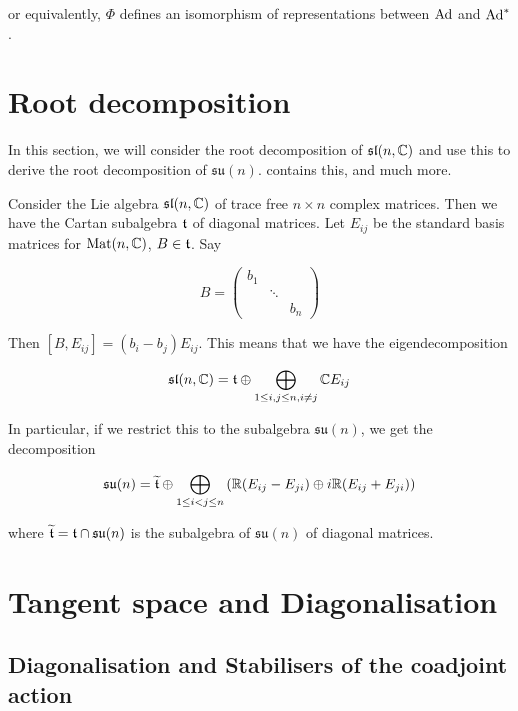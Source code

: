 \documentclass{article}
\newcommand{\su}{\mathfrak{su}}
\renewcommand{\sl}{\mathfrak{sl}}
\renewcommand{\tilde}{\widetilde}
\begin{document}
or equivalently, \(\Phi\) defines an isomorphism of representations between \(\operatorname{Ad}\) and \(\operatorname{Ad}^*\).

\section{Root decomposition}

In this section, we will consider the root decomposition of \(\sl(n, \C)\) and use this to derive the root decomposition of \(\su(n)\).  \cite[\S 8]{humphreys} contains this, and much more.

Consider the Lie algebra \(\sl(n, \C)\) of trace free \(n \times n\) complex matrices. Then we have the Cartan subalgebra \(\mathfrak{t}\) of diagonal matrices. Let \(E_{ij}\) be the standard basis matrices for \(\operatorname{Mat}(n, \mathbb{C})\), \(B \in \mathfrak{t}\). Say

\[B = \begin{pmatrix}
    b_1 \\
    & \ddots \\
    & & b_n
\end{pmatrix}\]

Then \([B, E_{ij}] = (b_i - b_j)E_{ij}\). This means that we have the eigendecomposition

\begin{equation}
    \label{eq:sln-root}
    \sl(n, \C) = \mft \oplus \bigoplus_{1 \le i, j \le n, i \ne j} \C E_{ij}
\end{equation}

In particular, if we restrict this to the subalgebra \(\su(n)\), we get the decomposition

\begin{equation}
    \label{eq:sun-root}
    \su(n) = \tilde\mft \oplus \bigoplus_{1 \le i < j \le n} \left(\R(E_{ij} - E_{ji}) \oplus i\R (E_{ij} + E_{ji})\right)
\end{equation}

where \(\tilde \mft = \mft \cap \su(n)\) is the subalgebra of \(\su(n)\) of diagonal matrices. 

\section{Tangent space and Diagonalisation}

\label{sec:tangent}

\subsection{Diagonalisation and Stabilisers of the coadjoint action}
\end{document}
